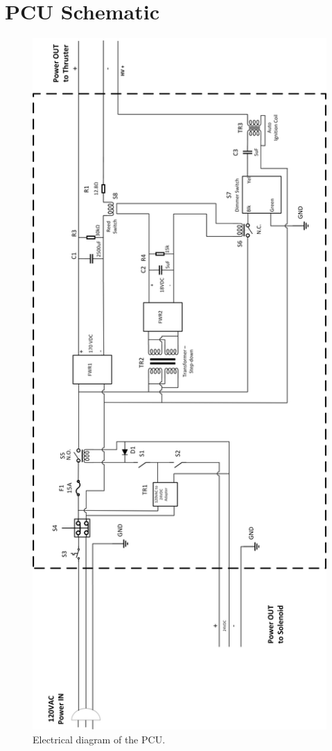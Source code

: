 \documentclass[conference]{IEEEtran}
\begin{document}




\onecolumn
\appendices{}
\section{PCU Schematic}
\begin{figure}[h]
  \includegraphics[height=.8\vsize,keepaspectratio]{figs/PCU_Schematic_No_AI_4_27_rotated.png}
  \caption{Electrical diagram of the PCU.}
\label{fig:pcu-schematic}
\end{figure}
\end{document}
